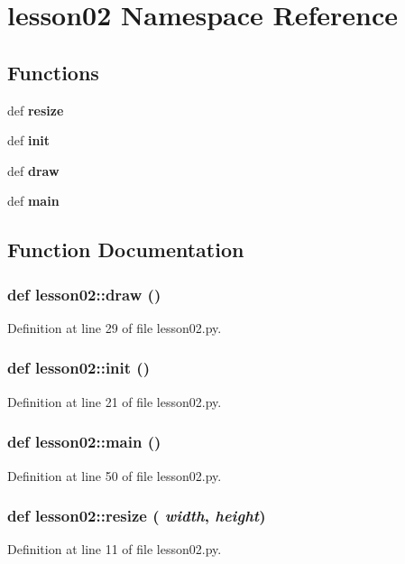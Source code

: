 \section{lesson02 Namespace Reference}
\label{namespacelesson02}


\subsection*{Functions}
\begin{CompactItemize}
\item 
def {\bf resize}
\item 
def {\bf init}
\item 
def {\bf draw}
\item 
def {\bf main}
\end{CompactItemize}


\subsection{Function Documentation}
\subsubsection{\setlength{\rightskip}{0pt plus 5cm}def lesson02::draw ()}\label{namespacelesson02_4d1297ef3cce70c4fd4147f736c56ac3}




Definition at line 29 of file lesson02.py.
\subsubsection{\setlength{\rightskip}{0pt plus 5cm}def lesson02::init ()}\label{namespacelesson02_6c7ab24cf11f956667a7e64bee7c80b0}




Definition at line 21 of file lesson02.py.
\subsubsection{\setlength{\rightskip}{0pt plus 5cm}def lesson02::main ()}\label{namespacelesson02_ca4066950f4824c9c5d66a79c3802841}




Definition at line 50 of file lesson02.py.
\subsubsection{\setlength{\rightskip}{0pt plus 5cm}def lesson02::resize ( {\em width},  {\em height})}\label{namespacelesson02_65e2795b26a76fd987b37b5cb4afc4e8}




Definition at line 11 of file lesson02.py.
